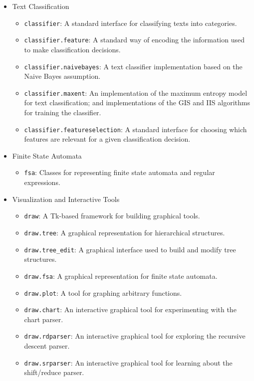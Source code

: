 \documentclass[11pt]{article}
\def\nogap{\setlength\itemsep{.0in}\setlength{\parskip}{0in}}
\begin{document}
{\begin{itemize}
  \item Text Classification
    \begin{itemize}\nogap
      \item \texttt{classifier}: A standard interface for classifying
          texts into categories.
      \item \texttt{classifier.feature}: A standard way of encoding
          the information used to make classification decisions.
      \item \texttt{classifier.naivebayes}: A text classifier
          implementation based on the Naive Bayes assumption.
      \item \texttt{classifier.maxent}: An implementation of the
          maximum entropy model for text classification; and
          implementations of the GIS and IIS algorithms for training
          the classifier.
      \item \texttt{classifier.featureselection}: A standard interface
          for choosing which features are relevant for a given
          classification decision.
    \end{itemize}

  \item Finite State Automata
    \begin{itemize}\nogap 
      \item \texttt{fsa}: Classes for representing finite state
          automata and regular expressions.
    \end{itemize}

  \item Visualization and Interactive Tools
    \begin{itemize}\nogap 
      \item \texttt{draw}: A Tk-based framework for building
            graphical tools.
      \item \texttt{draw.tree}: A graphical representation for
            hierarchical structures.
      \item \texttt{draw.tree\_edit}: A graphical interface used to
            build and modify tree structures.
      \item \texttt{draw.fsa}: A graphical representation for finite
            state automata.
      \item \texttt{draw.plot}: A tool for graphing
            arbitrary functions.
      \item \texttt{draw.chart}: An interactive graphical tool for
            experimenting with the chart parser.
      \item \texttt{draw.rdparser}: An interactive graphical tool for
            exploring the recursive descent parser.
      \item \texttt{draw.srparser}: An interactive graphical tool for
            learning about the shift/reduce parser.
    \end{itemize}

\end{itemize}
}
\end{document}
